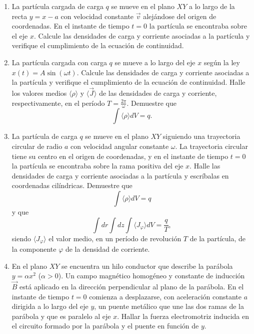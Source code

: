 \documentclass[12pt,a4paper]{book}
\begin{document}
\begin{enumerate}
\item La partícula cargada de carga $q$ se mueve en el plano $XY$ a lo largo de la recta $y = x - a$ con velocidad constante $\vec{v}$ alejándose del origen de coordenadas. En el instante de tiempo $t = 0$ la partícula se encontraba sobre el eje $x$. Calcule las densidades de carga y corriente asociadas a la partícula y verifique el cumplimiento de la ecuación de continuidad.

\item La partícula cargada con carga $q$ se mueve a lo largo del eje $x$ según la ley $x(t) = A \sin(\omega t)$. Calcule las densidades de carga y corriente asociadas a la partícula y verifique el cumplimiento de la ecuación de continuidad. Halle los valores medios $\langle\rho\rangle$ y $\langle\vec{J}\rangle$ de las densidades de carga y corriente, respectivamente, en el período $T = \frac{2\pi}{\omega}$. Demuestre que
\begin{equation*}
\int \langle\rho\rangle dV = q.
\end{equation*}

\item La partícula de carga $q$ se mueve en el plano $XY$ siguiendo una trayectoria circular de radio $a$ con velocidad angular constante $\omega$. La trayectoria circular tiene su centro en el origen de coordenadas, y en el instante de tiempo $t = 0$ la partícula se encontraba sobre la rama positiva del eje $x$. Halle las densidades de carga y corriente asociadas a la partícula y escríbalas en coordenadas cilíndricas. Demuestre que
\begin{equation*}
\int \langle\rho\rangle dV = q
\end{equation*}
y que
\begin{equation*}
\int dr \int dz \int \langle J_\varphi\rangle dV = \frac{q}{T},
\end{equation*}
siendo $\langle J_\varphi \rangle$ el valor medio, en un período de revolución $T$ de la partícula, de la componente $\varphi$ de la densidad de corriente.

\item En el plano $XY$ se encuentra un hilo conductor que describe la parábola $y = \alpha x^2$ ($\alpha > 0$). Un campo magnético homogéneo y constante de inducción $\vec{B}$ está aplicado en la dirección perpendicular al plano de la parábola. En el instante de tiempo $t = 0$ comienza a desplazarse, con aceleración constante $a$ dirigida a lo largo del eje $y$, un puente metálico que une las dos ramas de la parábola y que es paralelo al eje $x$. Hallar la fuerza electromotriz inducida en el circuito formado por la parábola y el puente en función de $y$.


\end{enumerate}
\end{document}
